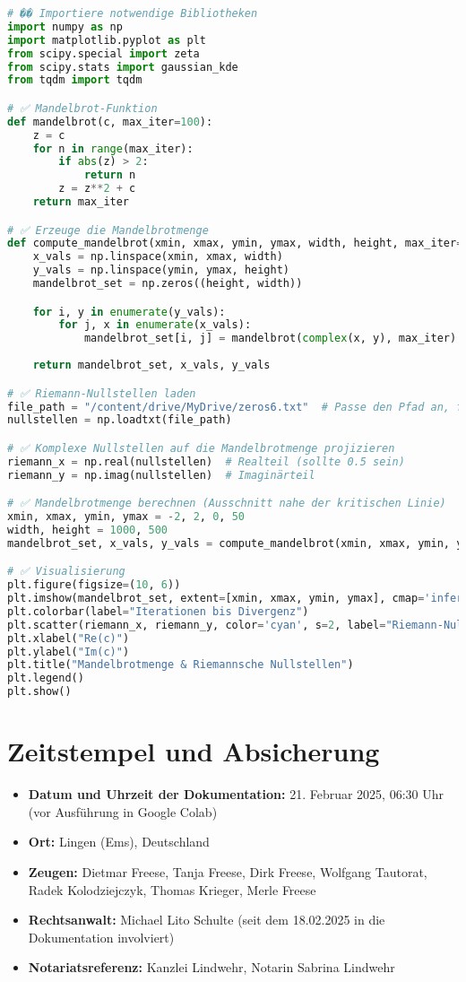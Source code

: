 \documentclass[a4paper,12pt]{article}
\begin{document}
\begin{lstlisting}[language=Python, caption=Python-Code zur Analyse der RH-Nullstellen in der Mandelbrotmenge]
# �� Importiere notwendige Bibliotheken
import numpy as np
import matplotlib.pyplot as plt
from scipy.special import zeta
from scipy.stats import gaussian_kde
from tqdm import tqdm

# ✅ Mandelbrot-Funktion
def mandelbrot(c, max_iter=100):
    z = c
    for n in range(max_iter):
        if abs(z) > 2:
            return n
        z = z**2 + c
    return max_iter

# ✅ Erzeuge die Mandelbrotmenge
def compute_mandelbrot(xmin, xmax, ymin, ymax, width, height, max_iter=100):
    x_vals = np.linspace(xmin, xmax, width)
    y_vals = np.linspace(ymin, ymax, height)
    mandelbrot_set = np.zeros((height, width))

    for i, y in enumerate(y_vals):
        for j, x in enumerate(x_vals):
            mandelbrot_set[i, j] = mandelbrot(complex(x, y), max_iter)
    
    return mandelbrot_set, x_vals, y_vals

# ✅ Riemann-Nullstellen laden
file_path = "/content/drive/MyDrive/zeros6.txt"  # Passe den Pfad an, falls nötig
nullstellen = np.loadtxt(file_path)

# ✅ Komplexe Nullstellen auf die Mandelbrotmenge projizieren
riemann_x = np.real(nullstellen)  # Realteil (sollte 0.5 sein)
riemann_y = np.imag(nullstellen)  # Imaginärteil

# ✅ Mandelbrotmenge berechnen (Ausschnitt nahe der kritischen Linie)
xmin, xmax, ymin, ymax = -2, 2, 0, 50
width, height = 1000, 500
mandelbrot_set, x_vals, y_vals = compute_mandelbrot(xmin, xmax, ymin, ymax, width, height, max_iter=100)

# ✅ Visualisierung
plt.figure(figsize=(10, 6))
plt.imshow(mandelbrot_set, extent=[xmin, xmax, ymin, ymax], cmap='inferno', aspect='auto')
plt.colorbar(label="Iterationen bis Divergenz")
plt.scatter(riemann_x, riemann_y, color='cyan', s=2, label="Riemann-Nullstellen")
plt.xlabel("Re(c)")
plt.ylabel("Im(c)")
plt.title("Mandelbrotmenge & Riemannsche Nullstellen")
plt.legend()
plt.show()
\end{lstlisting}

\section{Zeitstempel und Absicherung}
\begin{itemize}
    \item \textbf{Datum und Uhrzeit der Dokumentation:} 21. Februar 2025, 06:30 Uhr (vor Ausführung in Google Colab)
    \item \textbf{Ort:} Lingen (Ems), Deutschland
    \item \textbf{Zeugen:} Dietmar Freese, Tanja Freese, Dirk Freese, Wolfgang Tautorat, Radek Kolodziejczyk, Thomas Krieger, Merle Freese
    \item \textbf{Rechtsanwalt:} Michael Lito Schulte (seit dem 18.02.2025 in die Dokumentation involviert)
    \item \textbf{Notariatsreferenz:} Kanzlei Lindwehr, Notarin Sabrina Lindwehr
\end{itemize}
\end{document}
